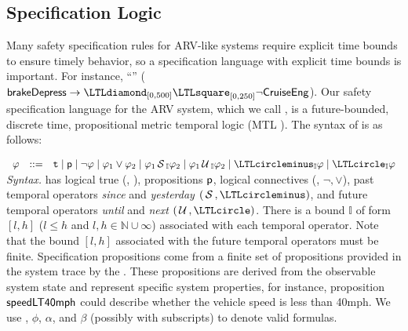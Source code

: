 \subsection{Specification Logic}
Many safety specification rules for ARV-like systems require explicit time bounds to ensure timely behavior,
so a specification language with explicit time bounds is important.
For instance,
``''
($\pred{brakeDepress} \rightarrow \eventually_{[0, 500]} \henceforth_{[0,250]} \neg \pred{CruiseEng}$).
Our safety specification language for the ARV system, which we call \planguage, is a future-bounded,
discrete time, propositional metric temporal logic (MTL \cite{Koymans1990}).
The syntax of \planguage is as follows:

\vspace*{1pt}
\(
\begin{array}{ccc}
\policy & ::=  & \true \mid \pred{p} \mid \neg \policy \mid \policy_1\vee \policy_2\mid
\policy_1\since_{\interval}\policy_2 \mid \policy_1\until_{\interval}\policy_2\mid\yesterday_{\interval}\policy\mid \tomorrow_{\interval}\policy
\end{array}
\) \\
\textit{Syntax.}
\planguage has logical true (\ie, \true),
 propositions $\mathsf{p}$, logical connectives (\ie, $\neg, \vee$),
past temporal operators \emph{since} and \emph{yesterday} $(\since, \yesterday)$,
and future temporal operators \emph{until} and \emph{next} $(\until, \tomorrow)$.
There is a bound $\mathbb{I}$ of form $[l,h]$ ($l\leq h$ and $l,h\in\mathbb{N}\cup\infty$)
associated with each temporal operator.
Note that the bound  $[l,h]$ associated with the future temporal operators must be finite.
Specification propositions  come from a finite set of propositions provided in
the system trace by the \sfmap.
These propositions are derived from the observable system state and represent specific system properties, for instance,
proposition $\mathsf{speedLT40mph}$ could describe whether the vehicle speed is less than 40mph.
We use \policy, $\phi$, $\alpha$, and $\beta$ (possibly with subscripts) to denote valid \planguage formulas.
%


